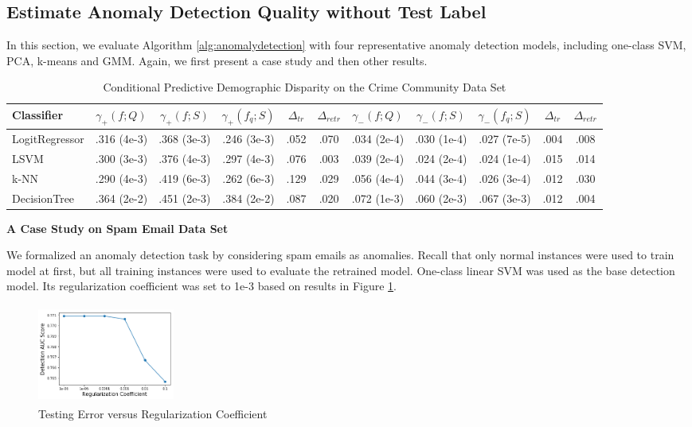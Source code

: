 
\subsection{Estimate Anomaly Detection Quality 
without Test Label}

In this section, we evaluate Algorithm 
\ref{alg:anomalydetection} 
with four representative anomaly detection models, 
including one-class SVM, PCA, k-means and GMM. 
Again, we first present a case study and then other results. 

\begin{table}[t]
\centering
\renewcommand{\arraystretch}{1.5}
\caption{Conditional Predictive Demographic Disparity on the 
Crime Community Data Set}
\begin{tabular}{l|ccccc|ccccc} \hline 
\bf Classifier & \bf $\gamma_{+}(f; Q)$ & \bf $\gamma_{+}(f; S)$ 
& \bf $\gamma_{+}(f_{q}; S)$ & \bf $\Delta_{tr}$ & 
\bf $\Delta_{retr}$ & \bf $\gamma_{-}(f; Q)$ & \bf $\gamma_{-}(f; S)$ 
& \bf $\gamma_{-}(f_{q}; S)$ & \bf $\Delta_{tr}$ & 
\bf $\Delta_{retr}$ \\ \hline 
LogitRegressor & .316 (4e-3) & .368 (3e-3) & .246 (3e-3) & .052 & .070 
& .034 (2e-4) & .030 (1e-4) & .027 (7e-5) & .004 & .008 \\ 
LSVM & .300 (3e-3) & .376 (4e-3) & .297 (4e-3) & .076 & .003 
& .039 (2e-4) & .024 (2e-4) & .024 (1e-4) & .015 & .014\\ 
k-NN & .290 (4e-3) & .419 (6e-3) & .262 (6e-3) & .129 & .029 
& .056 (4e-4) & .044 (3e-4) & .026 (3e-4) & .012 & .030\\  
DecisionTree & .364 (2e-2) & .451 (2e-3) & .384 (2e-2) & .087 & .020 
& .072 (1e-3) & .060 (2e-3) & .067 (3e-3) & .012 & .004\\  \hline 
\end{tabular}
\label{exp1:disparity}
\end{table}

{\noindent \bf A Case Study on Spam Email Data Set} 

We formalized an anomaly detection task by considering 
spam emails as anomalies. Recall that only normal 
instances were used to train model at first, but all 
training instances were used to evaluate the retrained model.
One-class linear SVM was used as the base detection model. 
Its regularization coefficient was set to 1e-3 based on 
results in Figure \ref{exp1:anomalymodelselection}. 

\begin{figure}[h]
\centering
\includegraphics[width=4.5cm,height=3.25cm]{exp1_anomalymodelselection.png}
\vspace{-10pt}
\caption{Testing Error versus Regularization Coefficient}
\label{exp1:anomalymodelselection}
\end{figure}

